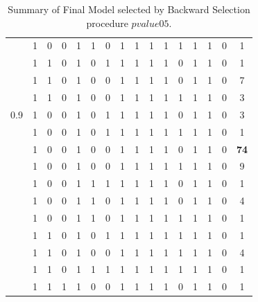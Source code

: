 \documentclass[12pt, letter]{article}\usepackage[]{graphicx}\usepackage[]{color}
\begin{document}
\begin{table}
{\begin{tabular}{|c|c|c|c|c|c|c|c|c|c|c|c|c|c|c|c|}
   & 1 & 0 & 0 & 1 & 1 & 0 & 1 & 1 & 1 & 1 & 1 & 1 & 1 & 0 & 1 \\ 
   & 1 & 1 & 0 & 1 & 0 & 1 & 1 & 1 & 1 & 1 & 0 & 1 & 1 & 0 & 1 \\ 
   & 1 & 1 & 0 & 1 & 0 & 0 & 1 & 1 & 1 & 1 & 0 & 1 & 1 & 0 & 7 \\ 
   & 1 & 1 & 0 & 1 & 0 & 0 & 1 & 1 & 1 & 1 & 1 & 1 & 1 & 0 & 3 \\ 
   \hline
0.9 & 1 & 0 & 0 & 1 & 0 & 1 & 1 & 1 & 1 & 1 & 0 & 1 & 1 & 0 & 3 \\ 
   & 1 & 0 & 0 & 1 & 0 & 1 & 1 & 1 & 1 & 1 & 1 & 1 & 1 & 0 & 1 \\ 
   & 1 & 0 & 0 & 1 & 0 & 0 & 1 & 1 & 1 & 1 & 0 & 1 & 1 & 0 & \textbf{74} \\ 
   & 1 & 0 & 0 & 1 & 0 & 0 & 1 & 1 & 1 & 1 & 1 & 1 & 1 & 0 & 9 \\ 
   & 1 & 0 & 0 & 1 & 1 & 1 & 1 & 1 & 1 & 1 & 0 & 1 & 1 & 0 & 1 \\ 
   & 1 & 0 & 0 & 1 & 1 & 0 & 1 & 1 & 1 & 1 & 0 & 1 & 1 & 0 & 4 \\ 
   & 1 & 0 & 0 & 1 & 1 & 0 & 1 & 1 & 1 & 1 & 1 & 1 & 1 & 0 & 1 \\ 
   & 1 & 1 & 0 & 1 & 0 & 1 & 1 & 1 & 1 & 1 & 1 & 1 & 1 & 0 & 1 \\ 
   & 1 & 1 & 0 & 1 & 0 & 0 & 1 & 1 & 1 & 1 & 1 & 1 & 1 & 0 & 4 \\ 
   & 1 & 1 & 0 & 1 & 1 & 1 & 1 & 1 & 1 & 1 & 1 & 1 & 1 & 0 & 1 \\ 
   & 1 & 1 & 1 & 1 & 0 & 0 & 1 & 1 & 1 & 1 & 0 & 1 & 1 & 0 & 1 \\ 
   \hline
\end{tabular}
}
\caption{Summary of Final Model selected by Backward Selection procedure $pvalue05$.} 
\label{simpvalue05}
\end{table}
\end{document}
